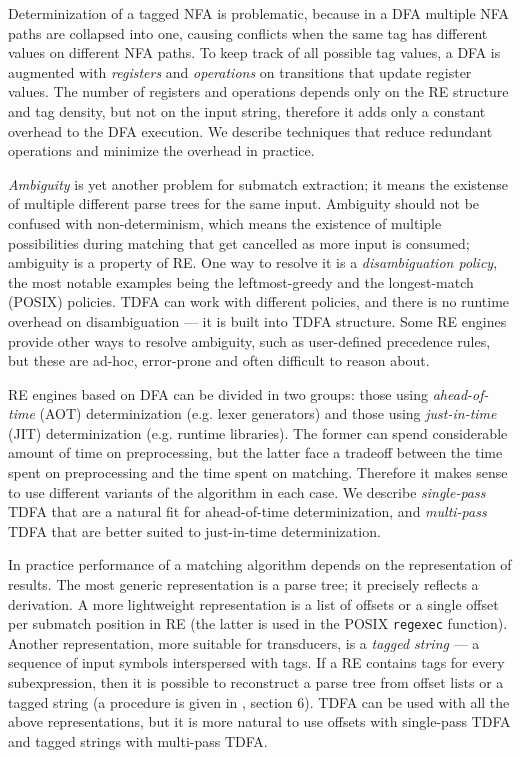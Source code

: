 \documentclass[]{article}
\begin{document}
Determinization of a tagged NFA is problematic, because in a DFA multiple NFA paths are collapsed into one,
causing conflicts when the same tag has different values on different NFA paths.
To keep track of all possible tag values, a DFA is augmented with \emph{registers}
and \emph{operations} on transitions that update register values.
The number of registers and operations depends only on the RE structure and tag density,
but not on the input string,
therefore it adds only a constant overhead to the DFA execution.
We describe techniques that reduce redundant operations and minimize the overhead in practice.
\medskip

\emph{Ambiguity} is yet another problem for submatch extraction;
it means the existense of multiple different parse trees for the same input.
Ambiguity should not be confused with non-determinism,
which means the existence of multiple possibilities during matching that get cancelled as more input is consumed;
ambiguity is a property of RE.
%
One way to resolve it is a \emph{disambiguation policy},
the most notable examples being the leftmost-greedy and the longest-match (POSIX) policies.
TDFA can work with different policies, and there is no runtime overhead on disambiguation --- it is built into TDFA structure.
Some RE engines provide other ways to resolve ambiguity, such as user-defined precedence rules,
but these are ad-hoc, error-prone and often difficult to reason about.
\medskip

RE engines based on DFA can be divided in two groups:
those using \emph{ahead-of-time} (AOT) determinization (e.g. lexer generators)
and those using \emph{just-in-time} (JIT) determinization (e.g. runtime libraries).
The former can spend considerable amount of time on preprocessing,
but the latter face a tradeoff between the time spent on preprocessing and the time spent on matching.
Therefore it makes sense to use different variants of the algorithm in each case.
We describe \emph{single-pass} TDFA that are a natural fit for ahead-of-time determinization,
and \emph{multi-pass} TDFA that are better suited to just-in-time determinization.
\medskip

In practice performance of a matching algorithm depends on the representation of results.
The most generic representation is a parse tree; it precisely reflects a derivation.
A more lightweight representation is a list of offsets or a single offset per submatch position in RE
(the latter is used in the POSIX \texttt{regexec} function).
Another representation, more suitable for transducers, is a \emph{tagged string} ---
a sequence of input symbols interspersed with tags.
If a RE contains tags for every subexpression,
then it is possible to reconstruct a parse tree from offset lists or a tagged string (a procedure is given in \cite{BorTro19}, section 6).
TDFA can be used with all the above representations,
but it is more natural to use offsets with single-pass TDFA
and tagged strings with multi-pass TDFA.
\medskip
\end{document}
